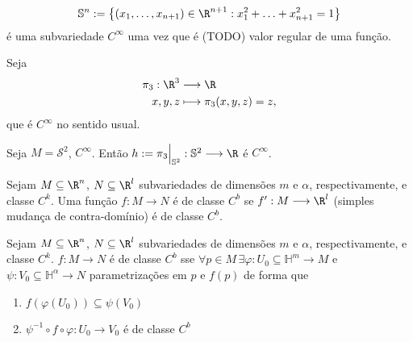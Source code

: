 \begin{note}
    \[
	\mathbb{S}^{n} := \left\{ \left( x_1,\ldots,x_{n+1} \right) \in \R^{n+1}: x_1^2+\ldots+x_{n+1}^2 = 1 \right\} 
    \] é uma subvariedade $C^{\infty}$ uma vez que é (TODO) valor regular de uma função.
\end{note}

\begin{eg}
    Seja \begin{align*}
        \pi_3: \R^{3} &\longrightarrow \R \\
        x,y,z &\longmapsto \pi_3(x,y,z) = z
    ,\end{align*}
    que é $C^{\infty}$ no sentido usual.

    Seja $M = \mathcal{S}^2$, $C^{\infty}$. Então $h := \pi_3\Big|_{\mathbb{S}^2}: \mathbb{S}^2 \longrightarrow \R$ é $C^{\infty}$.
\end{eg}

\begin{definition}
    Sejam $M\subseteq\R^{n}$, $N\subseteq\R^{l}$ subvariedades de dimensões $m$ e $\alpha$, respectivamente, e classe $C^{k}$. Uma função $f: M \longrightarrow N$ é de classe $C^{b}$ se $f': M \longrightarrow \R^{l}$ (simples mudança de contra-domínio) é de classe $C^{b}$.
\end{definition}

\begin{prop}
    Sejam $M\subseteq\R^{n}$, $N\subseteq\R^{l}$ subvariedades de dimensões $m$ e $\alpha$, respectivamente, e classe $C^{k}$. $f: M \longrightarrow N$ é de classe $C^{b}$ sse $\forall p \in M\, \exists \varphi : U_0\subseteq\mathbb{H}^{m}  \longrightarrow M$ e $\psi: V_0\subseteq\mathbb{H}^{\alpha} \longrightarrow N$ parametrizações em $p$ e $f\left( p \right) $ de forma que
    \begin{enumerate}
        \item $f\left( \varphi \left( U_0 \right)  \right) \subseteq\psi\left( V_0 \right) $
	\item $\psi^{-1}\circ f \circ \varphi : U_0 \longrightarrow V_0$ é de classe $C^{b}$
    \end{enumerate}
\end{prop}

